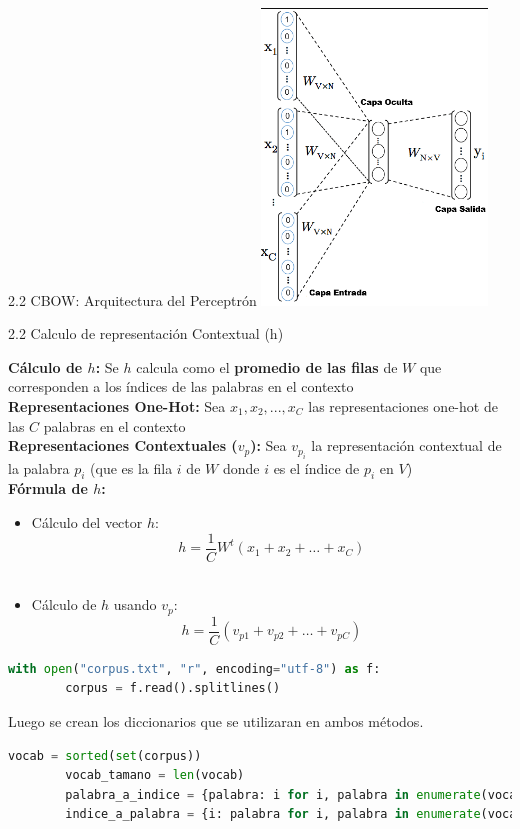 \documentclass{beamer}
\begin{document}
	
\begin{frame}[fragile]{2.2 CBOW: Arquitectura del Perceptrón}
\centering
\includegraphics[width=0.45\textwidth]{CBOW_arquitectura}
	
\end{frame}


\begin{frame}[fragile]{2.2 Calculo de representación Contextual (h)}

		\justifying
		\textbf{Cálculo de $h$:} Se $h$ calcula como el \textbf{promedio de las filas} de $W$ que corresponden a los índices de las palabras en el contexto\\
		\vspace{0.1cm}
		\textbf{Representaciones One-Hot:}  Sea $x_1, x_2, ..., x_C$ las representaciones one-hot de las $C$ palabras en el contexto\\
		\vspace{0.1cm}
		\textbf{Representaciones Contextuales ($v_p$):} Sea $v_{p_i}$ la representación contextual de la palabra $p_i$ (que es la fila $i$ de $W$ donde $i$ es el índice de $p_i$ en $V$) \\
		\vspace{0.1cm}
		\textbf{Fórmula de $h$:} 						\\
		\begin{itemize}
			\item Cálculo del vector $h$: 	
			$$h = \frac{1}{C} W^t(x_1 + x_2 + \dots + x_C)$$\\
			\item Cálculo de $h$ usando $v_p$:
			 $$h = \frac{1}{C} (v_{p1} + v_{p2} + \dots + v_{pC})$$
		\end{itemize}
	\begin{lstlisting}[language=Python]
		with open("corpus.txt", "r", encoding="utf-8") as f:
		corpus = f.read().splitlines()
	\end{lstlisting}
	Luego se crean los diccionarios que se utilizaran en ambos métodos.
	\begin{lstlisting}[language=Python]
		vocab = sorted(set(corpus))
		vocab_tamano = len(vocab)
		palabra_a_indice = {palabra: i for i, palabra in enumerate(vocab)}
		indice_a_palabra = {i: palabra for i, palabra in enumerate(vocab)}
	\end{lstlisting}
	
\end{frame}
\end{document}

